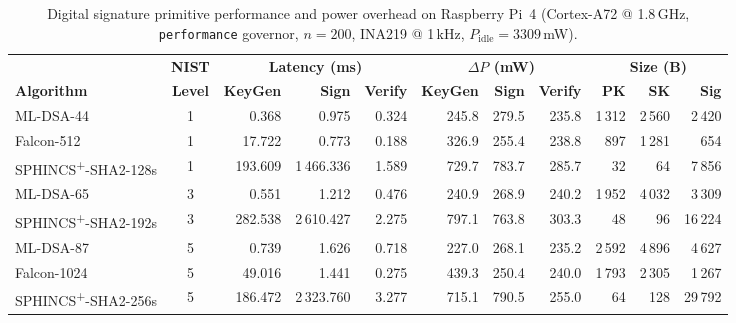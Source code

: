 \begin{table}[!t]
\centering
\footnotesize
\setlength{\tabcolsep}{3.8pt}
\caption{Digital signature primitive performance and power overhead on
Raspberry Pi~4 (Cortex-A72 @ 1.8\,GHz, \texttt{performance} governor,
$n{=}200$, INA219 @ 1\,kHz,
$P_{\mathrm{idle}}{=}3309$\,mW).}
\label{tab:sig-primitives}
\begin{tabular}{@{}l c r r r r r r r r r@{}}
\toprule
 & \textbf{NIST} & \multicolumn{3}{c}{\textbf{Latency (ms)}} & \multicolumn{3}{c}{\textbf{$\Delta P$ (mW)}} & \multicolumn{3}{c}{\textbf{Size (B)}} \\
\cmidrule(lr){3-5} \cmidrule(lr){6-8} \cmidrule(lr){9-11}
\textbf{Algorithm} & \textbf{Level} & \textbf{KeyGen} & \textbf{Sign} & \textbf{Verify} & \textbf{KeyGen} & \textbf{Sign} & \textbf{Verify} & \textbf{PK} & \textbf{SK} & \textbf{Sig} \\
\midrule
ML-DSA-44                  & 1 &    0.368 &    0.975 &  0.324 & 245.8 & 279.5 & 235.8 &  1\,312 &  2\,560 &  2\,420 \\
Falcon-512                 & 1 &   17.722 &    0.773 &  0.188 & 326.9 & 255.4 & 238.8 &    897  &  1\,281 &    654 \\
SPHINCS\textsuperscript{+}-SHA2-128s & 1 &  193.609 & 1\,466.336 &  1.589 & 729.7 & 783.7 & 285.7 &     32 &     64 &  7\,856 \\
\midrule
ML-DSA-65                  & 3 &    0.551 &    1.212 &  0.476 & 240.9 & 268.9 & 240.2 &  1\,952 &  4\,032 &  3\,309 \\
SPHINCS\textsuperscript{+}-SHA2-192s & 3 &  282.538 & 2\,610.427 &  2.275 & 797.1 & 763.8 & 303.3 &     48 &     96 & 16\,224 \\
\midrule
ML-DSA-87                  & 5 &    0.739 &    1.626 &  0.718 & 227.0 & 268.1 & 235.2 &  2\,592 &  4\,896 &  4\,627 \\
Falcon-1024                & 5 &   49.016 &    1.441 &  0.275 & 439.3 & 250.4 & 240.0 &  1\,793 &  2\,305 &  1\,267 \\
SPHINCS\textsuperscript{+}-SHA2-256s & 5 &  186.472 & 2\,323.760 &  3.277 & 715.1 & 790.5 & 255.0 &     64 &    128 & 29\,792 \\
\bottomrule
\end{tabular}
\end{table}

